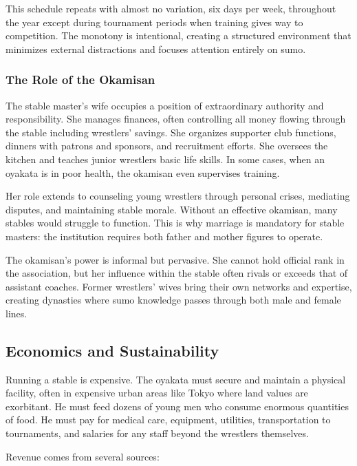 This schedule repeats with almost no variation, six days per week, throughout the year except during tournament periods when training gives way to competition. The monotony is intentional, creating a structured environment that minimizes external distractions and focuses attention entirely on sumo.

\subsubsection{The Role of the Okamisan}

The stable master's wife occupies a position of extraordinary authority and responsibility. She manages finances, often controlling all money flowing through the stable including wrestlers' savings. She organizes supporter club functions, dinners with patrons and sponsors, and recruitment efforts. She oversees the kitchen and teaches junior wrestlers basic life skills. In some cases, when an oyakata is in poor health, the okamisan even supervises training.

Her role extends to counseling young wrestlers through personal crises, mediating disputes, and maintaining stable morale. Without an effective okamisan, many stables would struggle to function. This is why marriage is mandatory for stable masters: the institution requires both father and mother figures to operate.

The okamisan's power is informal but pervasive. She cannot hold official rank in the association, but her influence within the stable often rivals or exceeds that of assistant coaches. Former wrestlers' wives bring their own networks and expertise, creating dynasties where sumo knowledge passes through both male and female lines.

\subsection{Economics and Sustainability}

Running a stable is expensive. The oyakata must secure and maintain a physical facility, often in expensive urban areas like Tokyo where land values are exorbitant. He must feed dozens of young men who consume enormous quantities of food. He must pay for medical care, equipment, utilities, transportation to tournaments, and salaries for any staff beyond the wrestlers themselves.

Revenue comes from several sources:

